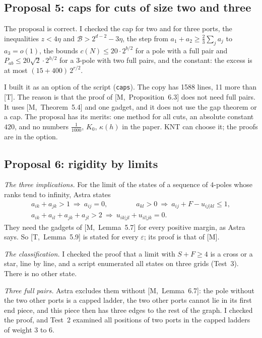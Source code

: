 \documentclass[11pt]{article}
\newcommand{\M}[1]{[M,~#1]}
\newcommand{\T}[1]{[T,~#1]}
\begin{document}
\subsection{Proposal 5: caps for cuts of size two and three}

The proposal is correct. I checked the cap for two and for three ports, the inequalities
$z<4\eta$ and $\mathcal B>2^{d-2}-3\eta$, the step from $a_1+a_2\ge\frac23\sum_ja_j$ to
$a_3=o(1)$, the bounds $c(N)\le20\cdot2^{b/2}$ for a pole with a full pair and
$P_{ab}\le20\sqrt2\cdot2^{h/2}$ for a $3$-pole with two full pairs, and the constant: the excess
is at most $(15+400)\,2^{r/2}$.

I built it as an option of the script (\texttt{caps}). The copy has 1588 lines, 11 more than
[T]. The reason is that the proof of \M{Proposition~6.3} does not need full pairs. It uses
\M{Theorem~5.4} and one gadget, and it does not use the gap theorem or a cap. The proposal has
its merits: one method for all cuts, an absolute constant $420$, and no numbers $\frac1{1000}$,
$K_0$, $\kappa(h)$ in the paper. KNT can choose it; the proofs are in the option.

\subsection{Proposal 6: rigidity by limits}\label{sec:limits}

\emph{The three implications.} For the limit of the states of a sequence of $4$-poles whose
ranks tend to infinity, Astra states
\begin{gather*}
  a_{ik}+a_{jk}>1\ \Longrightarrow\ a_{ij}=0,\qquad\qquad
  a_{kl}>0\ \Longrightarrow\ a_{ij}+F-u_{ij|kl}\le1,\\
  a_{ik}+a_{il}+a_{jk}+a_{jl}>2\ \Longrightarrow\ u_{ik|jl}+u_{il|jk}=0 .
\end{gather*}
They need the gadgets of \M{Lemma~5.7} for every positive margin, as Astra says. So
\T{Lemma~5.9} is stated for every $\varepsilon$; its proof is that of [M].

\emph{The classification.} I checked the proof that a limit with $S+F\ge4$ is a cross or a star,
line by line, and a script enumerated all states on three grids (Test~3). There is no other
state.

\emph{Three full pairs.} Astra excludes them without \M{Lemma~6.7}: the pole without the two
other ports is a capped ladder, the two other ports cannot lie in its first end piece, and this
piece then has three edges to the rest of the graph. I checked the proof, and Test~2 examined
all positions of two ports in the capped ladders of weight $3$ to $6$.
\end{document}
